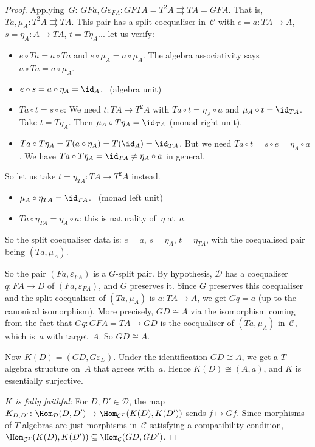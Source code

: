 \begin{proof}
Applying~$G$:
$GFa,G\varepsilon_{FA}\colon GFTA = T^2A\rightrightarrows TA = GFA$.
That is, $Ta,\mu_A\colon T^2A\rightrightarrows TA$.
This pair has a split coequaliser in~$\mathcal{C}$ with
$e = a\colon TA\to A$, $s = \eta_A\colon A\to TA$,
$t = T\eta_A... $ let us verify:
\begin{itemize}
\item $e\circ Ta = a\circ Ta$ and $e\circ\mu_A = a\circ\mu_A$.
    The algebra associativity says $a\circ Ta = a\circ\mu_A$. \checkmark
\item $e\circ s = a\circ\eta_A = \id_A$. \checkmark\ (algebra unit)
\item $Ta\circ t = s\circ e$: We need $t\colon TA\to T^2A$ with
    $Ta\circ t = \eta_A\circ a$ and $\mu_A\circ t = \id_{TA}$.
    Take $t = T\eta_A$.  Then $\mu_A\circ T\eta_A = \id_{TA}$
    (monad right unit). \checkmark
\item $Ta\circ T\eta_A = T(a\circ\eta_A) = T(\id_A) = \id_{TA}$.
    But we need $Ta\circ t = s\circ e = \eta_A\circ a$.
    We have $Ta\circ T\eta_A = \id_{TA}\neq\eta_A\circ a$ in general.
\end{itemize}

So let us take $t = \eta_{TA}\colon TA\to T^2A$ instead.
\begin{itemize}
\item $\mu_A\circ\eta_{TA} = \id_{TA}$. \checkmark\ (monad left unit)
\item $Ta\circ\eta_{TA} = \eta_A\circ a$: this is naturality of~$\eta$
    at~$a$. \checkmark
\end{itemize}
So the split coequaliser data is: $e = a$, $s = \eta_A$, $t = \eta_{TA}$,
with the coequalised pair being $(Ta,\mu_A)$.

So the pair $(Fa,\varepsilon_{FA})$ is a $G$-split pair.
By hypothesis, $\mathcal{D}$ has a coequaliser
$q\colon FA\to D$ of $(Fa,\varepsilon_{FA})$, and $G$ preserves it.
Since $G$ preserves this coequaliser and the split coequaliser of
$(Ta,\mu_A)$ is $a\colon TA\to A$, we get $Gq = a$ (up to the
canonical isomorphism).  More precisely, $GD\cong A$ via the
isomorphism coming from the fact that $Gq\colon GFA = TA\to GD$
is the coequaliser of $(Ta,\mu_A)$ in~$\mathcal{C}$, which is~$a$
with target~$A$.  So $GD\cong A$.

Now $K(D) = (GD, G\varepsilon_D)$.
Under the identification $GD\cong A$, we get a $T$-algebra structure
on~$A$ that agrees with~$a$.  Hence $K(D)\cong(A,a)$, and $K$ is
essentially surjective.

\emph{$K$ is fully faithful:}
For $D,D'\in\mathcal{D}$, the map
$K_{D,D'}\colon\Hom_{\mathcal{D}}(D,D')\to
\Hom_{\mathcal{C}^T}(K(D),K(D'))$
sends $f\mapsto Gf$.  Since morphisms of $T$-algebras are just
morphisms in~$\mathcal{C}$ satisfying a compatibility condition,
$\Hom_{\mathcal{C}^T}(K(D),K(D')) \subseteq \Hom_{\mathcal{C}}(GD,GD')$.


\end{proof}
